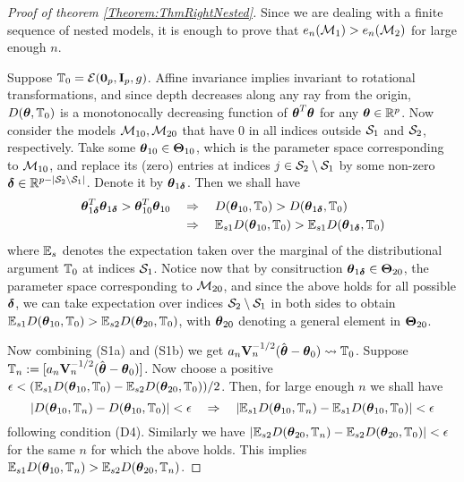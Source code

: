 \begin{proof}[Proof of theorem \ref{Theorem:ThmRightNested}]

Since we are dealing with a finite sequence of nested models, it is enough to prove that $e_n({\cal{M}}_1 ) > e_n({\cal{M}}_2 )$ for large enough $n$.

Suppose ${\mathbb{T}}_0 = {\cal{E}} ({\bf 0}_p, {\mathbf{I}}_p, g)$. Affine invariance implies invariant to rotational transformations, and since depth decreases along any ray from the origin, $D( {\boldsymbol{\theta}}, {\mathbb{T}}_0)$ is a monotonocally decreasing function of ${\boldsymbol{\theta}}^T {\boldsymbol{\theta}}$ for any ${\boldsymbol{\theta}} \in {\mathbb{R}}^p$. Now consider the models ${\cal{M}}_{10}, {\cal{M}}_{20}$ that have 0 in all indices outside ${\cal{S}}_1$ and ${\cal{S}}_2$, respectively. Take some ${\boldsymbol{\theta}}_{10} \in {\boldsymbol{\Theta}}_{10}$, which is the parameter space corresponding to ${\cal{M}}_{10}$, and replace its (zero) entries at indices $j \in {\cal{S}}_2 \setminus {\cal{S}}_1$ by some non-zero ${\boldsymbol{\delta}} \in {\mathbb{R}}^{p - | {\cal{S}}_2 \setminus {\cal{S}}_1 |}$. Denote it by ${\boldsymbol{\theta}}_{1 {\boldsymbol{\delta}}}$. Then we shall have
%
\begin{align*}
{\boldsymbol{\theta}}_{1 {\boldsymbol{\delta}}}^T {\boldsymbol{\theta}}_{1 {\boldsymbol{\delta}}} > {\boldsymbol{\theta}}_{10}^T {\boldsymbol{\theta}}_{10}
& \quad \Rightarrow \quad
D( {\boldsymbol{\theta}}_{10}, {\mathbb{T}}_0) > D( {\boldsymbol{\theta}}_{1 {\boldsymbol{\delta}}}, {\mathbb{T}}_0)\\
& \quad \Rightarrow \quad
{\mathbb{E}}_{s1} D( {\boldsymbol{\theta}}_{10}, {\mathbb{T}}_0) > {\mathbb{E}}_{s1} D( {\boldsymbol{\theta}}_{1 {\boldsymbol{\delta}}}, {\mathbb{T}}_0)
\end{align*}
%
where ${\mathbb{E}}_s$ denotes the expectation taken over the marginal of the distributional argument ${\mathbb{T}}_0$ at indices ${\cal{S}}_1$. Notice now that by consitruction ${\boldsymbol{\theta}}_{1 {\boldsymbol{\delta}}} \in {\boldsymbol{\Theta}}_{20}$, the parameter space corresponding to ${\cal{M}}_{20}$, and since the above holds for all possible ${\boldsymbol{\delta}}$, we can take expectation over indices ${\cal{S}}_2 \setminus {\cal{S}}_1$ in both sides to obtain ${\mathbb{E}}_{s1} D( {\boldsymbol{\theta}}_{10}, {\mathbb{T}}_0) > {\mathbb{E}}_{s2} D( {\boldsymbol{\theta}}_{20}, {\mathbb{T}}_0)$, with ${\boldsymbol{\theta}}_{20}$ denoting a general element in ${\boldsymbol{\Theta}}_{20}$.

Now combining (S1a) and (S1b) we get $a_n {\mathbf{V}}_n^{-1/2} (\hat {{\boldsymbol{\theta}}} - {\boldsymbol{\theta}}_0 ) \leadsto {\mathbb{T}}_0$. Suppose ${\mathbb{T}}_n := [ a_n {\mathbf{V}}_n^{-1/2} (\hat {{\boldsymbol{\theta}}} - {\boldsymbol{\theta}}_0 ) ]$. Now choose a positive $\epsilon < ({\mathbb{E}}_{s1} D( {\boldsymbol{\theta}}_{10}, {\mathbb{T}}_0) - {\mathbb{E}}_{s2} D( {\boldsymbol{\theta}}_{20}, {\mathbb{T}}_0))/2$. Then, for large enough $n$ we shall have
%
$$
\left| D( {\boldsymbol{\theta}}_{10}, {\mathbb{T}}_n) - D( {\boldsymbol{\theta}}_{10}, {\mathbb{T}}_0) \right| < \epsilon
\quad \Rightarrow \quad
| {\mathbb{E}}_{s1} D( {\boldsymbol{\theta}}_{10}, {\mathbb{T}}_n) - {\mathbb{E}}_{s1} D( {\boldsymbol{\theta}}_{10}, {\mathbb{T}}_0) | < \epsilon
$$
%
following condition (D4). Similarly we have $| {\mathbb{E}}_{s2} D( {\boldsymbol{\theta}}_{20}, {\mathbb{T}}_n) - {\mathbb{E}}_{s2} D( {\boldsymbol{\theta}}_{20}, {\mathbb{T}}_0) | < \epsilon $ for the same $n$ for which the above holds. This implies ${\mathbb{E}}_{s1} D( {\boldsymbol{\theta}}_{10}, {\mathbb{T}}_n) > {\mathbb{E}}_{s2} D( {\boldsymbol{\theta}}_{20}, {\mathbb{T}}_n)$.


\end{proof}
